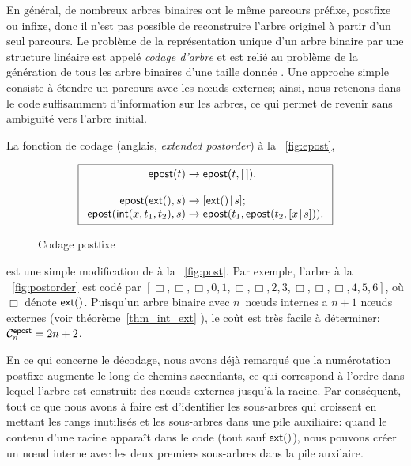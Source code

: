 En général, de nombreux arbres binaires ont le même parcours préfixe,
postfixe ou infixe, donc il n'est pas possible de reconstruire l'arbre
originel à partir d'un seul parcours. Le problème de la représentation
unique d'un arbre binaire par une structure linéaire est appelé
\emph{codage d'arbre} \citep{Makinen_1991} et est relié au problème de
la génération de tous les arbre binaires d'une taille donnée
\citep[7.2.1.6]{Knuth_2011}. Une approche simple consiste à étendre un
parcours avec les nœuds externes; ainsi, nous retenons dans le
code suffisamment d'information sur les arbres, ce qui permet de
revenir sans ambiguïté vers l'arbre initial.

La fonction de codage
(anglais, \emph{extended postorder}) à la \fig~\vref{fig:epost},
\begin{figure}[b]
\begin{equation*}
\boxed{
\begin{array}{r@{\;}c@{\;}l}
\fun{epost}(t) & \rightarrow & \fun{epost}(t,\el).\\
\\
\fun{epost}(\fun{ext}(),s) & \rightarrow
  & \cons{\fun{ext}()}{s};\\
\fun{epost}(\fun{int}(x,t_1,t_2),s) & \rightarrow
  & \fun{epost}(t_1,\fun{epost}(t_2,\cons{x}{s})).
\end{array}}
\end{equation*}
\caption{Codage postfixe}
\label{fig:epost}
\end{figure}
est une simple modification de  à
la \fig~\vref{fig:post}. Par exemple, l'arbre à la
\fig~\vref{fig:postorder} est codé par \([\Box, \Box, \Box, 0, 1,
\Box, \Box, 2, 3, \Box, \Box, \Box, 4, 5, 6]\), où \(\Box\) dénote
\(\fun{ext}()\). Puisqu'un arbre binaire avec \(n\)~nœuds internes
a \(n+1\) nœuds externes (voir théorème~\ref{thm_int_ext}
), le coût est très facile à déterminer:
\(\C{\fun{epost}}{n} = 2n + 2\).

En ce qui concerne le décodage, nous avons déjà remarqué que la
numérotation postfixe augmente le long de chemins ascendants, ce qui
correspond à l'ordre dans lequel l'arbre est construit: des nœuds
externes jusqu'à la racine. Par conséquent, tout ce que nous avons à
faire est d'identifier les sous-arbres qui croissent en mettant les
rangs inutilisés et les sous-arbres dans une pile auxiliaire: quand le
contenu d'une racine apparaît dans le code (tout sauf
\(\fun{ext}()\)), nous pouvons créer un nœud interne avec les deux
premiers sous-arbres dans la pile auxilaire.

